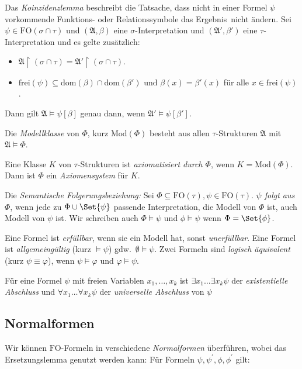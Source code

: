 \documentclass{panikzettel}
\newcommand{\A}{\mathfrak{A}}
\newcommand{\FO}{\mathrm{FO}}
\newcommand{\dom}{\mathrm{dom}}
\newcommand{\frei}{\mathrm{frei}}
\renewcommand{\Mod}{\mathrm{Mod}}
\begin{document}
Das \emph{Koinzidenzlemma} beschreibt die Tatsache, dass nicht in einer Formel $\psi$ vorkommende Funktions- oder Relationssymbole das \glqq Ergebnis\grqq\ nicht ändern. Sei $\psi \in \FO(\sigma \cap \tau)$ und $(\A, \beta)$ eine $\sigma$-Interpretation und $(\A', \beta')$ eine $\tau$-Interpretation und es gelte zusätzlich:
\begin{itemize}
    \item $\A \upharpoonright (\sigma \cap \tau) = \A' \upharpoonright (\sigma \cap \tau)$.
    \item $\frei(\psi) \subseteq \dom(\beta) \cap \dom(\beta')$ und $\beta(x) = \beta'(x)$ für alle $x \in \frei(\psi)$.
\end{itemize}

Dann gilt $\A \models \psi[\beta]$ genau dann, wenn $\A' \models \psi[\beta']$.

Die \emph{Modellklasse} von $\Phi$, kurz $\Mod(\Phi)$ besteht aus allen $\tau$-Strukturen $\A$ mit $\A \models \Phi$.

Eine Klasse $K$ von $\tau$-Strukturen ist \emph{axiomatisiert durch $\Phi$}, wenn $K = \Mod(\Phi)$. Dann ist $\Phi$ ein \emph{Axiomensystem} für $K$.

Die \emph{Semantische Folgerungsbeziehung:} Sei $\Phi \subseteq \FO(\tau), \psi \in \FO(\tau)$. \emph{$\psi$ folgt aus $\Phi$}, wenn jede zu $\Phi \cup \Set{\psi}$ passende Interpretation, die Modell von $\Phi$ ist, auch Modell von $\psi$ ist. Wir schreiben auch $\Phi \models \psi$ und $\phi \models \psi$ wenn $\Phi = \Set{\phi}$.

Eine Formel ist \emph{erfüllbar}, wenn sie ein Modell hat, sonst \emph{unerfüllbar}. Eine Formel ist \emph{allgemeingültig} (kurz $\models \psi$) gdw.\ $\emptyset \models \psi$. Zwei Formeln sind \emph{logisch äquivalent} (kurz $\psi \equiv \varphi$), wenn $\psi \models \varphi$ und $\varphi \models \psi$.

Für eine Formel $\psi$ mit freien Variablen $x_1,\dots,x_k$ ist $\exists x_1 \dots \exists x_k \psi$ der \emph{existentielle Abschluss} und $\forall x_1 \dots \forall x_k \psi$ der \emph{universelle Abschluss} von $\psi$

\subsection{Normalformen}

Wir können $\FO$-Formeln in verschiedene \emph{Normalformen} überführen, wobei das Ersetzungslemma genutzt werden kann: Für Formeln $\psi, \psi^\prime, \phi, \phi^\prime$ gilt:
\end{document}
